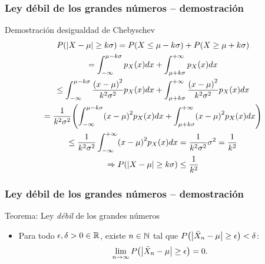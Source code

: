 \documentclass[table]{beamer}
\begin{document}
\begin{frame}
    \frametitle{Ley débil de los grandes números -- demostración}
    \begin{block}{Demostración desigualdad de Chebyschev}
        \begin{multline*}
            \prob{\vparens{X - \mu} \geq k \sigma}
            = \prob{X \leq \mu - k \sigma} + \prob{X \geq \mu + k \sigma}
            \\
            = \int_{- \infty}^{\mu - k \sigma} \ppdf{X}{x} dx
            + \int_{\mu + k \sigma}^{+ \infty} \ppdf{X}{x} dx
            \\
            \leq
            \int_{- \infty}^{\mu - k \sigma} \frac{\parens{x - \mu}^{2}}{k^{2}\sigma^{2}} \ppdf{X}{x} dx
            + \int_{\mu + k \sigma}^{+ \infty} \frac{\parens{x - \mu}^{2}}{k^{2}\sigma^{2}} \ppdf{X}{x} dx
            \\
            = \frac{1}{k^{2} \sigma^{2}} \parens{\int_{- \infty}^{\mu - k \sigma} \parens{x - \mu}^{2} \ppdf{X}{x} dx
            + \int_{\mu + k \sigma}^{+ \infty} \parens{x - \mu}^{2} \ppdf{X}{x} dx}
            \\
            \leq \frac{1}{k^{2} \sigma^{2}}
            \int_{- \infty}^{+ \infty} \parens{x - \mu}^{2} \ppdf{X}{x} dx
            = \frac{1}{k^{2} \sigma^{2}} \sigma^{2}
            = \frac{1}{k^{2}}
            \\
            \Rightarrow
            \prob{\vparens{X - \mu} \geq k \sigma} \leq \frac{1}{k^{2}}
        \end{multline*}
    \end{block}
\end{frame}

\begin{frame}
    \frametitle{Ley débil de los grandes números -- demostración}
    \begin{block}{Teorema: Ley \emph{débil} de los grandes números}
        \begin{itemize}
            \item Para todo $\epsilon, \delta > 0 \in \mathbb{R}$, existe $n \in \mathbb{N}$ tal que $\prob{\vparens{\bar{X}_{n} - \mu} \geq \epsilon} < \delta$:
                \begin{equation*}
                    \lim_{n \rightarrow \infty} \prob{\vparens{\bar{X}_{n} - \mu} \geq \epsilon} = 0 .
                \end{equation*}
        \end{itemize}
    \end{block}

\end{frame}
\end{document}
